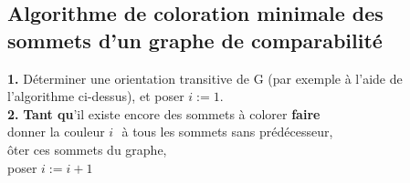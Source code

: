 \subsection*{Algorithme de coloration minimale des sommets d'un graphe de comparabilité}
\noindent \textbf{1.} Déterminer une orientation transitive de G (par exemple à l'aide de l'algorithme
ci-dessus), et poser $ i := 1 $.\\
\textbf{2.} \textbf{Tant qu}'il existe encore des sommets à colorer \textbf{faire}\\
donner la couleur $ i$  $ $ à tous les sommets sans prédécesseur,\\
ôter ces sommets du graphe,\\
poser $ i := i + 1 $
